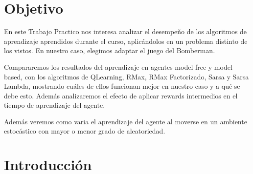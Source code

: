 \documentclass[a4paper,spanish] {article}
\begin{document}
\pagestyle{headings}



\newpage




\maketitle

		
\newpage
\tableofcontents
\newpage

\section{Objetivo}
	En  este Trabajo Practico nos interesa analizar el desempe\~ no de los algoritmos de aprendizaje aprendidos durante el curso,  aplic\'andolos  en un problema distinto de los vistos. En nuestro caso, elegimos adaptar el juego del Bomberman. 
	
	Compararemos los resultados del aprendizaje en agentes model-free y model-based, con los algoritmos de QLearning, RMax, RMax Factorizado, Sarsa y Sarsa Lambda, mostrando cu\'ales de ellos funcionan mejor en nuestro caso y a qu\'e se debe esto. Adem\'as analizaremos el efecto de aplicar rewards intermedios en el tiempo de aprendizaje del agente.
	
	Adem\'as veremos como varia el aprendizaje del agente al moverse en un ambiente estoc\'astico con mayor o menor grado de aleatoriedad.

\section{Introducci\'on}
\end{document}
